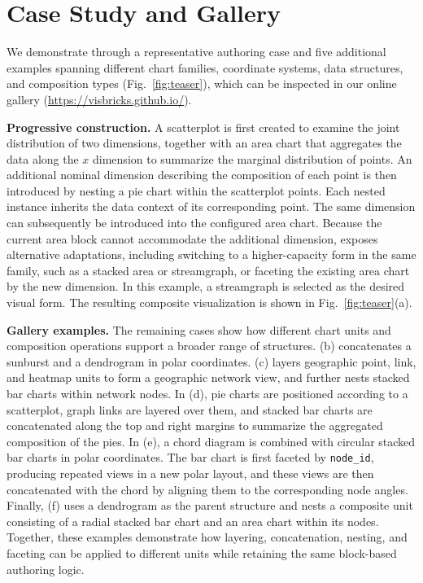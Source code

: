 \section{Case Study and Gallery}
\label{sec:case-studies}

We demonstrate {\system} through a representative authoring case and five
additional examples spanning different chart families, coordinate
systems, data structures, and composition types (Fig.~\ref{fig:teaser}), which can be inspected in our online gallery
(\url{https://visbricks.github.io/}).

\textbf{Progressive construction.}
A scatterplot is first created to examine the joint distribution of two
dimensions, together with an area chart that aggregates the data along the
$x$ dimension to summarize the marginal distribution of points. An additional
nominal dimension describing the composition of each point is then introduced
by nesting a pie chart within the scatterplot points. Each nested instance
inherits the data context of its corresponding point.
The same dimension can subsequently be introduced into the configured area
chart. Because the current area block cannot accommodate the additional
dimension, {\system} exposes alternative adaptations, including switching to a
higher-capacity form in the same family, such as a stacked area or streamgraph,
or faceting the existing area chart by the new dimension. In this example, a
streamgraph is selected as the desired visual form. The resulting composite
visualization is shown in Fig.~\ref{fig:teaser}(a).

\textbf{Gallery examples.}
The remaining cases show how different chart units and composition operations
support a broader range of structures. (b) concatenates a sunburst and a
dendrogram in polar coordinates. (c) layers geographic point, link, and
heatmap units to form a geographic network view, and further nests stacked bar
charts within network nodes. In (d), pie charts are positioned according to a
scatterplot, graph links are layered over them, and stacked bar charts are
concatenated along the top and right margins to summarize the aggregated
composition of the pies. In (e), a chord diagram is combined with circular
stacked bar charts in polar coordinates. The bar chart is first faceted by
\texttt{node\_id}, producing repeated views in a new polar layout, and these
views are then concatenated with the chord by aligning them to the
corresponding node angles. Finally, (f) uses a dendrogram as the parent
structure and nests a composite unit consisting of a radial stacked bar chart
and an area chart within its nodes. Together, these examples demonstrate how
layering, concatenation, nesting, and faceting can be applied to different
units while retaining the same block-based authoring logic.


